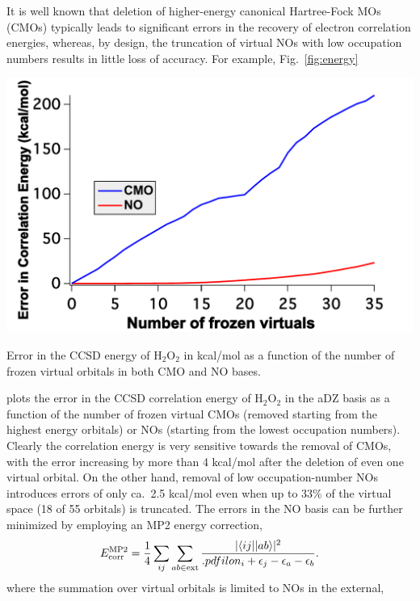 It is well known that deletion of higher-energy canonical Hartree-Fock MOs
(CMOs) typically leads to significant errors in the recovery of electron
correlation energies, whereas, by design, the truncation of virtual NOs with
low occupation numbers results in little loss of accuracy.\cite{Landau10,Taube05,Taube08}
For example, Fig.~\ref{fig:energy} 
\begin{MyFigure}[h!]
\centering
\includegraphics[width=0.6\linewidth]{figures_fvno/energy.pdf}
\caption{{\footnotesize Error in the CCSD energy of H$_2$O$_2$ in kcal/mol as a function of the number of frozen virtual orbitals in both CMO and NO bases.}}
\label{fig:energy}
\end{MyFigure}
plots the error in the CCSD correlation energy of H$_2$O$_2$ in the aDZ basis as a function of
the number of frozen virtual CMOs (removed starting from the highest energy
orbitals) or NOs (starting from the lowest occupation numbers).  Clearly the
correlation energy is very sensitive towards the removal of CMOs, with the
error increasing by more than 4 kcal/mol after the deletion of even one
virtual orbital.  On the other hand, removal of low occupation-number NOs
introduces errors of only ca.\ 2.5 kcal/mol even when up to 33\% of the
virtual space (18 of 55 orbitals) is truncated.  The errors in
the NO basis can be further minimized by employing an MP2 energy correction,
\begin{equation}
E^{\rm MP2}_{\rm corr} = \frac{1}{4} \sum_{ij} \sum_{ab \in {\rm ext}} \frac{|\langle
ij||ab\rangle|^2}{.pdfilon_i + \epsilon_j - \epsilon_a - \epsilon_b}.
\label{Eq:MP2}
\end{equation}
where the summation over virtual orbitals is limited to NOs in the external,
